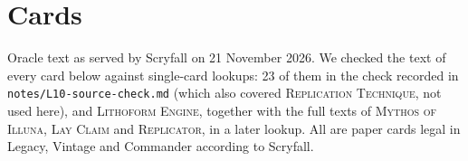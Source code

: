 \documentclass[11pt]{article}
\theoremstyle{definition}
\newcommand{\card}[1]{{\mdseries\scshape #1}}
\begin{document}



\appendix

\section{Cards}\label{app:cards}

Oracle text as served by Scryfall on 21 November 2026. We checked the text of every card
below against single-card lookups: 23 of them in the check recorded in
\texttt{notes/L10-source-check.md} (which also covered \card{Replication Technique}, not
used here), and \card{Lithoform Engine}, together with the full texts of \card{Mythos of
Illuna}, \card{Lay Claim} and \card{Replicator}, in a later lookup. All are paper cards
legal in Legacy, Vintage and Commander according to Scryfall.
\end{document}
